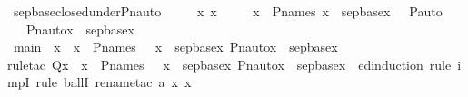 \begin{isabellebody}
\isamarkupfalse%
\ sep{\isacharunderscore}{\kern0pt}base{\isacharunderscore}{\kern0pt}closed{\isacharunderscore}{\kern0pt}under{\isacharunderscore}{\kern0pt}Pn{\isacharunderscore}{\kern0pt}auto\ {\isacharcolon}{\kern0pt}\ \isanewline
\ \ \ x{}\ x\ {\isasympi}\ \isanewline
\ \ \ {\isachardoublequoteopen}x{}\ {\isasymin}\ P{\isacharunderscore}{\kern0pt}names{\isachardoublequoteclose}\ {\isachardoublequoteopen}x\ {\isasymin}\ sep{\isacharunderscore}{\kern0pt}base{\isacharparenleft}{\kern0pt}x{}{\isacharparenright}{\kern0pt}{\isachardoublequoteclose}\ {\isachardoublequoteopen}{\isasympi}\ {\isasymin}\ P{\isacharunderscore}{\kern0pt}auto{\isachardoublequoteclose}\ \ \ \isanewline
\ \ \ {\isachardoublequoteopen}Pn{\isacharunderscore}{\kern0pt}auto{\isacharparenleft}{\kern0pt}{\isasympi}{\isacharparenright}{\kern0pt}{\isacharbackquote}{\kern0pt}x\ {\isasymin}\ sep{\isacharunderscore}{\kern0pt}base{\isacharparenleft}{\kern0pt}x{}{\isacharparenright}{\kern0pt}{\isachardoublequoteclose}\ \isanewline
%
\isadelimproof
%
\endisadelimproof
%
\isatagproof
{}\isamarkupfalse%
\ {\isacharminus}{\kern0pt}\ \isanewline
\ \ \isamarkupfalse%
\ main\ {\isacharcolon}{\kern0pt}\ {\isachardoublequoteopen}{\isasymAnd}x{}\ {\isachardot}{\kern0pt}\ x{}\ {\isasymin}\ P{\isacharunderscore}{\kern0pt}names\ {\isasymlongrightarrow}\ {\isacharparenleft}{\kern0pt}{\isasymforall}\ x\ {\isasymin}\ sep{\isacharunderscore}{\kern0pt}base{\isacharparenleft}{\kern0pt}x{}{\isacharparenright}{\kern0pt}{\isachardot}{\kern0pt}\ Pn{\isacharunderscore}{\kern0pt}auto{\isacharparenleft}{\kern0pt}{\isasympi}{\isacharparenright}{\kern0pt}{\isacharbackquote}{\kern0pt}x\ {\isasymin}\ sep{\isacharunderscore}{\kern0pt}base{\isacharparenleft}{\kern0pt}x{}{\isacharparenright}{\kern0pt}{\isacharparenright}{\kern0pt}{\isachardoublequoteclose}\ \isanewline
\ \ \isamarkupfalse%
{\isacharparenleft}{\kern0pt}rule{\isacharunderscore}{\kern0pt}tac\ Q{\isacharequal}{\kern0pt}{\isachardoublequoteopen}{\isasymlambda}x{}\ {\isachardot}{\kern0pt}\ x{}\ {\isasymin}\ P{\isacharunderscore}{\kern0pt}names\ {\isasymlongrightarrow}\ {\isacharparenleft}{\kern0pt}{\isasymforall}\ x\ {\isasymin}\ sep{\isacharunderscore}{\kern0pt}base{\isacharparenleft}{\kern0pt}x{}{\isacharparenright}{\kern0pt}{\isachardot}{\kern0pt}\ Pn{\isacharunderscore}{\kern0pt}auto{\isacharparenleft}{\kern0pt}{\isasympi}{\isacharparenright}{\kern0pt}{\isacharbackquote}{\kern0pt}x\ {\isasymin}\ sep{\isacharunderscore}{\kern0pt}base{\isacharparenleft}{\kern0pt}x{}{\isacharparenright}{\kern0pt}{\isacharparenright}{\kern0pt}{\isachardoublequoteclose}\ \ ed{\isacharunderscore}{\kern0pt}induction{\isacharcomma}{\kern0pt}\ rule\ impI{\isacharcomma}{\kern0pt}\ rule\ ballI{\isacharcomma}{\kern0pt}\ rename{\isacharunderscore}{\kern0pt}tac\ a\ x{}\ x{\isacharparenright}{\kern0pt}\isanewline

\end{isabellebody}

